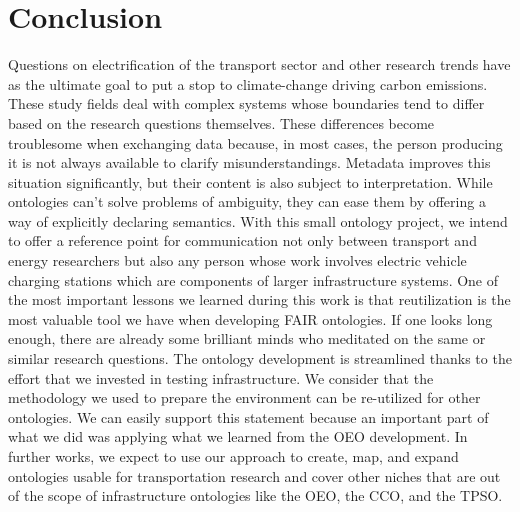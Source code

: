 ﻿\section{Conclusion}
\label{conclusion}

Questions on electrification of the transport sector and other research trends
have as the ultimate goal to put a stop to climate-change driving carbon
emissions. These study fields deal with complex systems whose boundaries tend to
differ based on the research questions themselves. These differences become
troublesome when exchanging data because, in most cases, the person producing it
is not always available to clarify misunderstandings. Metadata improves this
situation significantly, but their content is also subject to interpretation.
While ontologies can't solve problems of ambiguity, they can ease them by
offering a way of explicitly declaring semantics. With this small ontology
project, we intend to offer a reference point for communication not only between
transport and energy researchers but also any person whose work involves
electric vehicle charging stations which are components of larger infrastructure
systems. One of the most important lessons we learned during this work is that
reutilization is the most valuable tool we have when developing FAIR ontologies.
If one looks long enough, there are already some brilliant minds who meditated
on the same or similar research questions. The ontology development is
streamlined thanks to the effort that we invested in testing infrastructure. We
consider that the methodology we used to prepare the environment can be
re-utilized for other ontologies. We can easily support this statement because
an important part of what we did was applying what we learned from the OEO
development. In further works, we expect to use our approach to create, map, and
expand ontologies usable for transportation research and cover other niches that
are out of the scope of infrastructure ontologies like the OEO, the CCO, and the
TPSO.